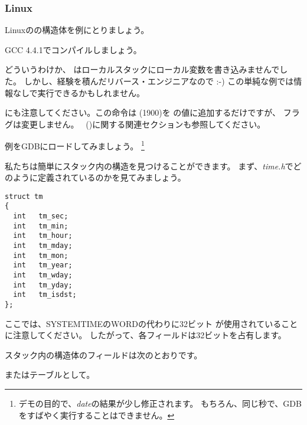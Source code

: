 ﻿\subsubsection{Linux}

Linuxのの構造体を例にとりましょう。



GCC 4.4.1でコンパイルしましょう。



どういうわけか、 \IDA はローカルスタックにローカル変数を書き込みませんでした。
しかし、経験を積んだリバース・エンジニアなので :-) この単純な例では情報なしで実行できるかもしれません。


にも注意してください。この命令は (1900)を \EAX の値に追加するだけですが、
フラグは変更しません。 \LEA{}~()に関する関連セクションも参照してください。


例をGDBにロードしてみましょう。
\footnote{デモの目的で、\emph{date}の結果が少し修正されます。 
もちろん、同じ秒で、GDBをすばやく実行することはできません。}



私たちは簡単にスタック内の構造を見つけることができます。
まず、\emph{time.h}でどのように定義されているのかを見てみましょう。

\begin{lstlisting}[caption=time.h, label=struct_tm,style=customc]
struct tm
{
  int	tm_sec;
  int	tm_min;
  int	tm_hour;
  int	tm_mday;
  int	tm_mon;
  int	tm_year;
  int	tm_wday;
  int	tm_yday;
  int	tm_isdst;
};
\end{lstlisting}

ここでは、SYSTEMTIMEのWORDの代わりに32ビット \Tint 
が使用されていることに注意してください。 
したがって、各フィールドは32ビットを占有します。

スタック内の構造体のフィールドは次のとおりです。



またはテーブルとして。

